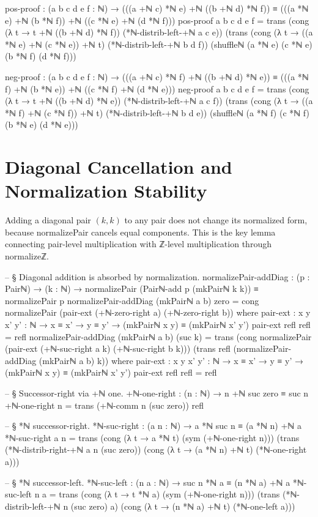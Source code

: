 \documentclass[11pt,a4paper]{book}
\def\texttt#1{#1}%
\begin{document}
\begin{code}
    pos-proof : (a b c d e f : ℕ) →
      (((a +ℕ c) *ℕ e) +ℕ ((b +ℕ d) *ℕ f))
        ≡
      (((a *ℕ e) +ℕ (b *ℕ f)) +ℕ ((c *ℕ e) +ℕ (d *ℕ f)))
    pos-proof a b c d e f =
      trans
        (cong (λ t → t +ℕ ((b +ℕ d) *ℕ f)) (*ℕ-distrib-left-+ℕ a c e))
        (trans
          (cong (λ t → ((a *ℕ e) +ℕ (c *ℕ e)) +ℕ t) (*ℕ-distrib-left-+ℕ b d f))
          (shuffleℕ (a *ℕ e) (c *ℕ e) (b *ℕ f) (d *ℕ f)))

    neg-proof : (a b c d e f : ℕ) →
      (((a +ℕ c) *ℕ f) +ℕ ((b +ℕ d) *ℕ e))
        ≡
      (((a *ℕ f) +ℕ (b *ℕ e)) +ℕ ((c *ℕ f) +ℕ (d *ℕ e)))
    neg-proof a b c d e f =
      trans
        (cong (λ t → t +ℕ ((b +ℕ d) *ℕ e)) (*ℕ-distrib-left-+ℕ a c f))
        (trans
          (cong (λ t → ((a *ℕ f) +ℕ (c *ℕ f)) +ℕ t) (*ℕ-distrib-left-+ℕ b d e))
          (shuffleℕ (a *ℕ f) (c *ℕ f) (b *ℕ e) (d *ℕ e)))
\end{code}

\section{Diagonal Cancellation and Normalization Stability}

Adding a diagonal pair $(k,k)$ to any pair does not change its normalized form, because
\texttt{normalizePair} cancels equal components. This is the key lemma connecting
pair-level multiplication with ℤ-level multiplication through \texttt{normalizeℤ}.

\begin{code}
-- § Diagonal addition is absorbed by normalization.
normalizePair-addDiag : (p : Pairℕ) → (k : ℕ) →
  normalizePair (Pairℕ-add p (mkPairℕ k k)) ≡ normalizePair p
normalizePair-addDiag (mkPairℕ a b) zero =
  cong normalizePair (pair-ext (+ℕ-zero-right a) (+ℕ-zero-right b))
  where
    pair-ext : {x y x' y' : ℕ} → x ≡ x' → y ≡ y' → (mkPairℕ x y) ≡ (mkPairℕ x' y')
    pair-ext refl refl = refl
normalizePair-addDiag (mkPairℕ a b) (suc k) =
  trans
    (cong normalizePair (pair-ext (+ℕ-suc-right a k) (+ℕ-suc-right b k)))
    (trans
      refl
      (normalizePair-addDiag (mkPairℕ a b) k))
  where
    pair-ext : {x y x' y' : ℕ} → x ≡ x' → y ≡ y' → (mkPairℕ x y) ≡ (mkPairℕ x' y')
    pair-ext refl refl = refl

-- § Successor-right via +ℕ one.
+ℕ-one-right : (n : ℕ) → n +ℕ suc zero ≡ suc n
+ℕ-one-right n = trans (+ℕ-comm n (suc zero)) refl

-- § *ℕ successor-right.
*ℕ-suc-right : (a n : ℕ) → a *ℕ suc n ≡ (a *ℕ n) +ℕ a
*ℕ-suc-right a n =
  trans
    (cong (λ t → a *ℕ t) (sym (+ℕ-one-right n)))
    (trans
      (*ℕ-distrib-right-+ℕ a n (suc zero))
      (cong (λ t → (a *ℕ n) +ℕ t) (*ℕ-one-right a)))

-- § *ℕ successor-left.
*ℕ-suc-left : (n a : ℕ) → suc n *ℕ a ≡ (n *ℕ a) +ℕ a
*ℕ-suc-left n a =
  trans
    (cong (λ t → t *ℕ a) (sym (+ℕ-one-right n)))
    (trans
      (*ℕ-distrib-left-+ℕ n (suc zero) a)
      (cong (λ t → (n *ℕ a) +ℕ t) (*ℕ-one-left a)))
\end{code}
\end{document}
